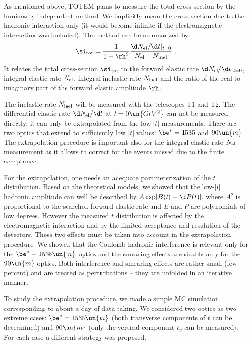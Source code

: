 \vskip1mm
As mentioned above, TOTEM plans to measure the total cross-section by the luminosity independent method. We implicitly mean the cross-section due to the hadronic interaction only (it would become infinite if the electromagnetic interaction was included). The method can be summarized by:
$$
	\si_{\rm tot} = {1\over 1+\rh^2} {\d N_{\rm el}/\d t|_{t=0}\over N_{\rm el} + N_{\rm inel}}\ .
$$
It relates the total cross-section $\si_{\rm tot}$ to the forward elastic rate $\d N_{\rm el}/\d t|_{t=0}$, integral elastic rate $N_{\rm el}$, integral inelastic rate $N_{\rm inel}$ and the ratio of the real to imaginary part of the forward elastic amplitude $\rh$.

The inelastic rate $N_{\rm inel}$ will be measured with the telescopes T1 and T2.
The differential elastic rate $\d N_{\rm el}/\d t$ at $t=0\un{GeV^2}$ can not be measured directly, it can only be extrapolated from the low-$|t|$ measurements. There are two optics that extend to sufficiently low $|t|$ values: $\be^* = 1535$ and $90\un{m}$. The extrapolation procedure is important also for the integral elastic rate $N_{\rm el}$ measurement as it allows to correct for the events missed due to the finite acceptance.

For the extrapolation, one needs an adequate parameterization of the $t$ distribution. Based on the theoretical models, we showed that the low-$|t|$ hadronic amplitude can well be described by $A \exp[B(t) + \i P(t)]$, where $A^2$ is proportional to the searched forward elastic rate and $B$ and $P$ are polynomials of low degrees. However the measured $t$ distribution is affected by the electromagnetic interaction and by the limited acceptance and resolution of the detectors. These two effects must be taken into account in the extrapolation procedure. We showed that the Coulomb-hadronic interference is relevant only for the $\be^*=1535\un{m}$ optics and the smearing effects are sizable only for the $90\un{m}$ optics. Both interference and smearing effects are rather small (few percent) and are treated as perturbations -- they are unfolded in an iterative manner.

To study the extrapolation procedure, we made a simple MC simulation corresponding to about a day of data-taking. We considered two optics as two extreme cases: $\be^* = 1535\un{m}$ (both transverse components of $t$ can be determined) and $90\un{m}$ (only the vertical component $t_y$ can be measured). For each case a different strategy was proposed.

